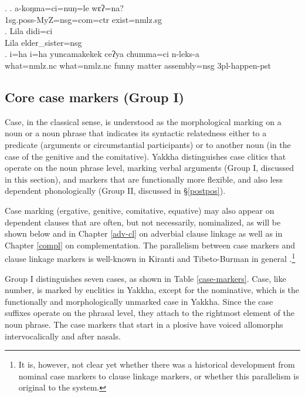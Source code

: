 \ex. \ag. a-koŋma=ci=nuŋ=le wɛʔ=na?\\
		{\sc 1sg.poss-}MyZ{\sc =nsg=com=ctr} exist{\sc [3sg]=nmlz.sg}\\
		  
	\bg. Lila didi=ci\\
		Lila elder\_sister{\sc =nsg}\\
		  
		\bg.  i=ha i=ha    yuncamakekek ceʔya chumma=ci     n-leks-a\\
		what{\sc =nmlz.nc} what{\sc =nmlz.nc} funny        matter assembly{\sc =nsg} {\sc 3pl-}happen{\sc -pst}\\
		 
	
\subsection{Core case markers (Group I)}\label{case}

Case, in the classical sense, is understood as the morphological marking on a noun or a noun phrase that indicates its syntactic relatedness either to a predicate (arguments or circumstantial participants)  or to  another noun (in the case of the genitive and the comitative). Yakkha distinguishes  case clitics  that operate on the noun phrase level, marking verbal arguments  (Group I, discussed in this section), and markers that are functionally more flexible, and also less dependent phonologically (Group II, discussed in §\ref{postpos}).


Case marking (ergative, genitive, comitative, equative) may also appear on dependent clauses that are often, but not necessarily, nominalized, as will be shown below and in Chapter \ref{adv-cl} on adverbial clause linkage as well as in Chapter \ref{compl} on complementation. The parallelism between case markers and clause linkage markers is well-known in Kiranti and Tibeto-Burman in general \citep{Genetti1986The-development, DeLancey1985_Etymological, Ebert1993Kiranti}.\footnote{It is, however, not clear yet whether there  was a historical development from nominal case markers to  clause linkage markers, or whether this parallelism is original to the system.} 

Group I distinguishes seven cases, as shown in Table \ref{case-markers}. Case, like number, is marked by enclitics in Yakkha, except for the nominative, which is the functionally and morphologically unmarked case in Yakkha. Since the case suffixes operate on the phrasal level, they attach to the rightmost element of the noun phrase. The case markers that start in a plosive have voiced allomorphs intervocalically and after nasals.


